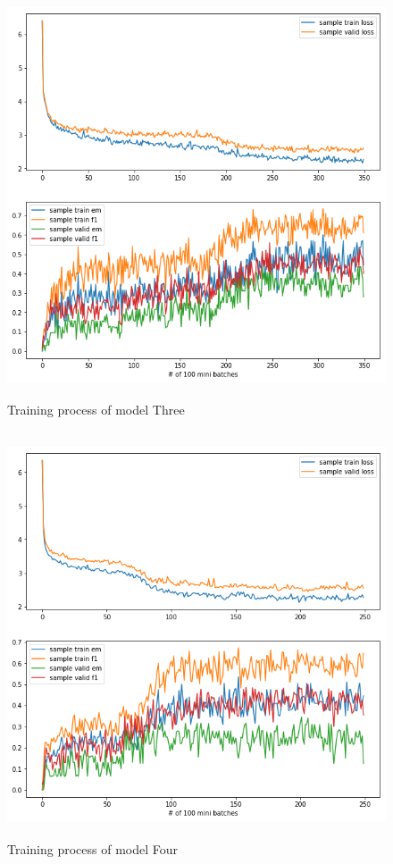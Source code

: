 \documentclass[modernstyle,12pt]{sjsuthesis}
\theoremstyle{definition}
\begin{document}
\begin{figure}[htbp]\centering
  \includegraphics[width=12cm, height=12cm]{figures/match_change1.png}
  \caption{Training process of model Three}
  \label{f:baseline_change1}
\end{figure}

\begin{figure}[htbp]\centering
  \includegraphics[width=12cm, height=12cm]{figures/match_change2.png}
  \caption{Training process of model Four}
  \label{f:baseline_change2}
\end{figure}
\end{document}
